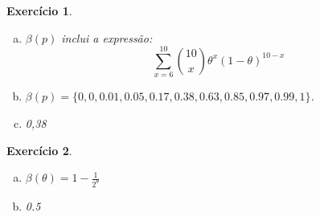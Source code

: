 \documentclass[letter,11pt]{article}
\newtheorem{exer}{Exercício}
\begin{document}
\begin{exer} \rm
\begin{enumerate}[a)]
 \item $\beta(p)$ inclui a expressão:
$$
\sum_{x=6}^{10}  {10 \choose x}\theta^x(1-\theta)^{10-x} 
$$
 
 \item $\beta(p) = \{0, 0, 0.01, 0.05, 0.17, 0.38, 0.63, 0.85, 0.97, 0.99, 1\}$. 
 
 \item 0,38

\end{enumerate}
\end{exer}


\begin{exer} \rm
\begin{enumerate}[a)]

\item $\beta(\theta)=1-\frac{1}{2^\theta}$
 \item 0.5
\end{enumerate}
\end{exer}
\end{document}
